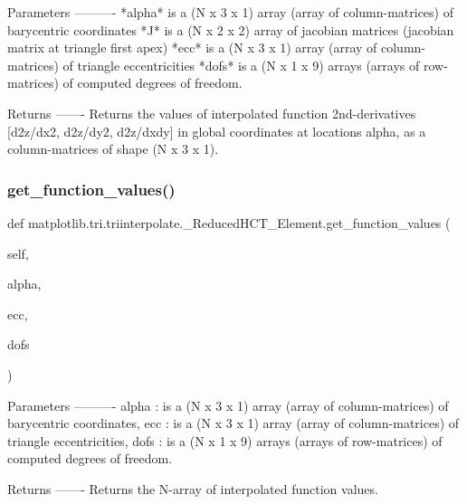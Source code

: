 \begin{DoxyVerb}Parameters
----------
*alpha* is a (N x 3 x 1) array (array of column-matrices) of
barycentric coordinates
*J* is a (N x 2 x 2) array of jacobian matrices (jacobian matrix at
triangle first apex)
*ecc* is a (N x 3 x 1) array (array of column-matrices) of triangle
eccentricities
*dofs* is a (N x 1 x 9) arrays (arrays of row-matrices) of computed
degrees of freedom.

Returns
-------
Returns the values of interpolated function 2nd-derivatives
[d2z/dx2, d2z/dy2, d2z/dxdy] in global coordinates at locations alpha,
as a column-matrices of shape (N x 3 x 1).
\end{DoxyVerb}
 \mbox{\label{classmatplotlib_1_1tri_1_1triinterpolate_1_1__ReducedHCT__Element_ae02a0ad48004a518f336deb2968c2665}} 
\subsubsection{\texorpdfstring{get\+\_\+function\+\_\+values()}{get\_function\_values()}}
{\footnotesize\ttfamily def matplotlib.\+tri.\+triinterpolate.\+\_\+\+Reduced\+H\+C\+T\+\_\+\+Element.\+get\+\_\+function\+\_\+values (\begin{DoxyParamCaption}\item[{}]{self,  }\item[{}]{alpha,  }\item[{}]{ecc,  }\item[{}]{dofs }\end{DoxyParamCaption})}

\begin{DoxyVerb}Parameters
----------
alpha : is a (N x 3 x 1) array (array of column-matrices) of
barycentric coordinates,
ecc : is a (N x 3 x 1) array (array of column-matrices) of triangle
eccentricities,
dofs : is a (N x 1 x 9) arrays (arrays of row-matrices) of computed
degrees of freedom.

Returns
-------
Returns the N-array of interpolated function values.
\end{DoxyVerb}
 \mbox{\label{classmatplotlib_1_1tri_1_1triinterpolate_1_1__ReducedHCT__Element_a55a70fad206d70afeed24b77ad30ab34}} 

